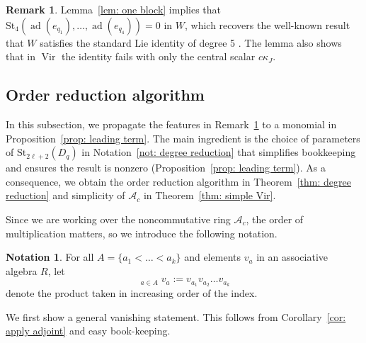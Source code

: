 \documentclass[12pt]{amsart}
\theoremstyle{plain}
\theoremstyle{definition}
\newtheorem{notation}[theorem]{Notation}
\newtheorem{remark}[theorem]{Remark}
\numberwithin{equation}{theorem}
\newcommand{\Vir}{\operatorname{Vir}}
\newcommand{\ad}{\operatorname{ad}}
\newcommand{\calA}{\mathcal A}
\newcommand{\St}{\mathrm{St}}
\DeclareMathOperator*{\iprod}{\overset{\rightarrow}{\prod}}
\begin{document}
\begin{remark}\label{rem: std W Vir}
    Lemma~\ref{lem: one block} implies that $\St_4(\ad(e_{q_1}), \dots, \ad(e_{q_4})) = 0$ in $W$, which recovers the well-known result that $W$ satisfies the standard Lie identity of degree 5 \cite{Razmyslov85}. The lemma also shows that in $\Vir$ the identity fails with only the central scalar $c \kappa_J$.
\end{remark}




\subsection{Order reduction algorithm}
In this subsection, we propagate the features in Remark~\ref{rem: std W Vir} to a monomial in Proposition~\ref{prop: leading term}. The main ingredient is the choice of parameters of $\St_{2\ell+2}(D_q)$ in Notation~\ref{not: degree reduction} that simplifies bookkeeping and ensures the result is nonzero (Proposition~\ref{prop: leading term}). As a consequence, we obtain the order reduction algorithm in Theorem~\ref{thm: degree reduction} and simplicity of $\calA_c$ in Theorem~\ref{thm: simple Vir}. 

Since we are working over the noncommutative ring $\calA_c$, the order of multiplication matters, so we introduce the following notation.
\begin{notation}
    For all $A = \{a_1 < \dots < a_k\}$ and elements $v_a$ in an associative algebra $R$, let 
    \[\iprod_{a \in A} v_a := v_{a_1} v_{a_2} \dots v_{a_k}\] denote the product taken in increasing order of the index.
\end{notation}

We first show a general vanishing statement. This follows from Corollary~\ref{cor: apply adjoint} and easy book-keeping.
\end{document}

